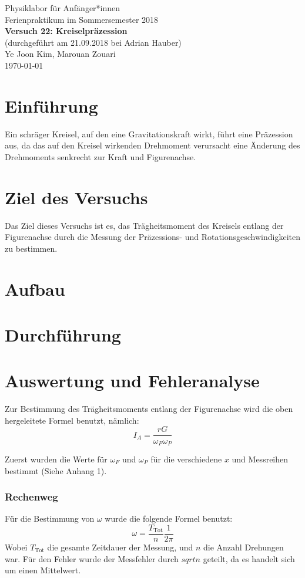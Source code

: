 \documentclass[11pt,a4paper]{article} %
\begin{document}
{
	\centering 
	\large 
	Physiklabor für Anfänger*innen \\
	Ferienpraktikum im Sommersemester 2018 \\[4mm]
	\textbf{\LARGE 
		Versuch 22: Kreiselpräzession
	} \\[3mm]
	(durchgeführt am 21.09.2018 bei Adrian Hauber) \\
	Ye Joon Kim, Marouan Zouari\\
	\today \\[10mm]
}

\section{Einführung}
Ein schräger Kreisel, auf den eine Gravitationskraft wirkt, führt eine Präzession aus, da das auf den Kreisel wirkenden Drehmoment verursacht eine Änderung des Drehmoments senkrecht zur Kraft und Figurenachse. 


\section{Ziel des Versuchs}
Das Ziel dieses Versuchs ist es, das Trägheitsmoment des Kreisels entlang der Figurenachse durch die Messung der Präzessions- und Rotationsgeschwindigkeiten zu bestimmen.

\section{Aufbau}

\section{Durchführung}

\section{Auswertung und Fehleranalyse}
Zur Bestimmung des Trägheitsmoments entlang der Figurenachse wird die oben hergeleitete Formel benutzt, nämlich:
$$I_A = \frac{rG}{\omega_F \omega_P}$$

Zuerst wurden die Werte für $\omega_F$ und $\omega_P$ für die verschiedene $x$ und Messreihen bestimmt (Siehe Anhang 1). 
\begin{tcolorbox}[colback=white]
\subsubsection{Rechenweg}
Für die Bestimmung von $\omega$ wurde die folgende Formel benutzt:
$$ \omega = \frac{T_\textrm{Tot}}{n}\frac{1}{2\pi}$$
Wobei $T_\textrm{Tot}$ die gesamte Zeitdauer der Messung, und $n$ die Anzahl Drehungen war.
Für den Fehler wurde der Messfehler durch $sqrt{n}$ geteilt, da es handelt sich um einen Mittelwert.
\end{tcolorbox}
\end{document}
